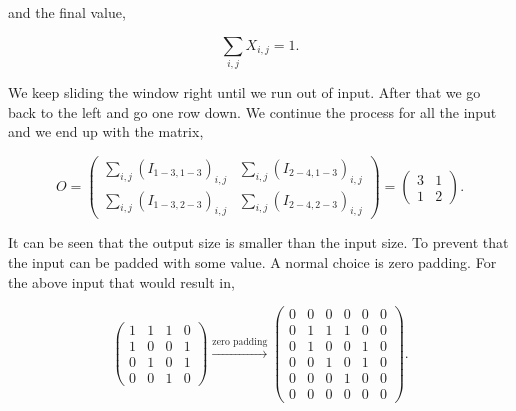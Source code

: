 \begin{description}
        and the final value,

        \begin{equation}
            \sum_{i,j} X_{i,j} = 1.
        \end{equation}

        We keep sliding the window right until we run out of input. After that
        we go back to the left and go one row down. We continue the process for
        all the input and we end up with the matrix,

        \begin{equation}
            O = \begin{pmatrix}
                \sum_{i,j} \left( I_{1-3,1-3} \right)_{i,j} &
                \sum_{i,j} \left( I_{2-4,1-3} \right)_{i,j} \\
                \sum_{i,j} \left( I_{1-3,2-3} \right)_{i,j} &
                \sum_{i,j} \left( I_{2-4,2-3} \right)_{i,j}
            \end{pmatrix} = \begin{pmatrix}
                3 & 1 \\
                1 & 2
            \end{pmatrix}.
        \end{equation}

        It can be seen that the output size is smaller than the input size.
        To prevent that the input can be padded with some value. A normal choice
        is zero padding. For the above input that would result in,

        \begin{equation}
            \begin{pmatrix}
                1 & 1 & 1 & 0 \\
                1 & 0 & 0 & 1 \\
                0 & 1 & 0 & 1 \\
                0 & 0 & 1 & 0
            \end{pmatrix} \xrightarrow{\text{zero padding}}
            \begin{pmatrix}
                0 & 0 & 0 & 0 & 0 & 0 \\
                0 & 1 & 1 & 1 & 0 & 0 \\
                0 & 1 & 0 & 0 & 1 & 0 \\
                0 & 0 & 1 & 0 & 1 & 0 \\
                0 & 0 & 0 & 1 & 0 & 0 \\
                0 & 0 & 0 & 0 & 0 & 0
            \end{pmatrix}.
        \end{equation}


\end{description}
